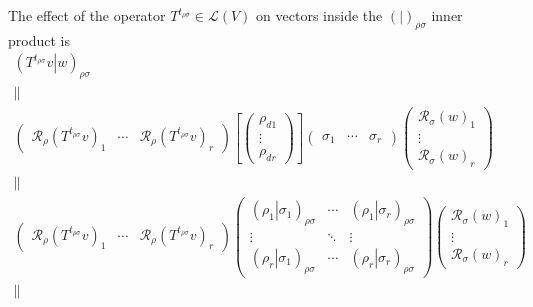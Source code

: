 \documentclass[aps,preprint]{revtex4}
\begin{document}
The effect of the operator $T^{t_{\rho \sigma }}\in \mathcal{L}\left(
V\right) $ on vectors inside the $\left( \left. {}\right\vert \right) _{\rho
\sigma }$ inner product is 
\begin{gather}
\left( \left. T^{t_{\rho \sigma }}v\right\vert w\right) _{\rho \sigma } \\
\parallel \\
\left( 
\begin{array}{ccc}
\mathcal{R}_{\rho }\left( T^{t_{\rho \sigma }}v\right) _{1} & \cdots & 
\mathcal{R}_{\rho }\left( T^{t_{\rho \sigma }}v\right) _{r}%
\end{array}%
\right) \left[ \left( 
\begin{array}{c}
\rho _{d1} \\ 
\vdots \\ 
\rho _{dr}%
\end{array}%
\right) \right] \left( 
\begin{array}{ccc}
\sigma _{1} & \cdots & \sigma _{r}%
\end{array}%
\right) \left( 
\begin{array}{c}
\mathcal{R}_{\sigma }\left( w\right) _{1} \\ 
\vdots \\ 
\mathcal{R}_{\sigma }\left( w\right) _{r}%
\end{array}%
\right) \\
\parallel \\
\left( 
\begin{array}{ccc}
\mathcal{R}_{\rho }\left( T^{t_{\rho \sigma }}v\right) _{1} & \cdots & 
\mathcal{R}_{\rho }\left( T^{t_{\rho \sigma }}v\right) _{r}%
\end{array}%
\right) \left( 
\begin{array}{ccc}
\left( \left. \rho _{1}\right\vert \sigma _{1}\right) _{\rho \sigma } & 
\cdots & \left( \left. \rho _{1}\right\vert \sigma _{r}\right) _{\rho \sigma
} \\ 
\vdots & \ddots & \vdots \\ 
\left( \left. \rho _{r}\right\vert \sigma _{1}\right) _{\rho \sigma } & 
\cdots & \left( \left. \rho _{r}\right\vert \sigma _{r}\right) _{\rho \sigma
}%
\end{array}%
\right) \left( 
\begin{array}{c}
\mathcal{R}_{\sigma }\left( w\right) _{1} \\ 
\vdots \\ 
\mathcal{R}_{\sigma }\left( w\right) _{r}%
\end{array}%
\right) \\
\parallel
\end{gather}%
\end{document}
